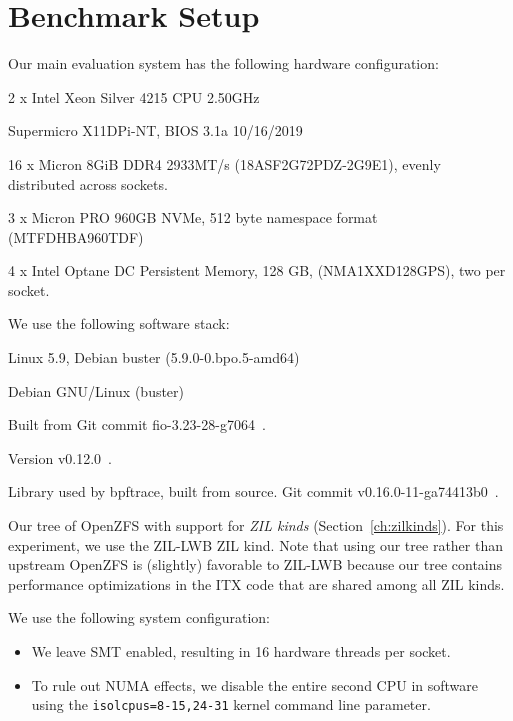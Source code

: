 \documentclass[12pt,a4paper,twoside]{book}
\begin{document}
{\section{Benchmark Setup}\label{ch:lwb_analysis:setup}
Our main evaluation system has the following hardware configuration:
\begin{description}[noitemsep,leftmargin=1.5cm,labelindent=1cm]
    \item[CPU] 2 x Intel Xeon Silver 4215 CPU \@ 2.50GHz
    \item[Mainboard] Supermicro X11DPi-NT, BIOS 3.1a 10/16/2019
    \item[DRAM] 16 x Micron 8GiB DDR4 2933MT/s (\mbox{18ASF2G72PDZ-2G9E1}), evenly distributed across sockets.
    \item[NVMe] 3 x Micron PRO 960GB NVMe, 512 byte namespace format (MTFDHBA960TDF)
    \item[PMEM] 4 x Intel Optane DC Persistent Memory, 128 GB, (NMA1XXD128GPS), two per socket.
\end{description}
We use the following software stack:
\begin{description}[noitemsep,leftmargin=1.5cm,labelindent=1cm]
    \item[Kernel] Linux 5.9, Debian buster (5.9.0-0.bpo.5-amd64)
    \item[Userland] Debian GNU/Linux (buster)
    \item[fio - Flexible I/O Tester] Built from Git commit \mbox{fio-3.23-28-g7064}~\cite{fioGithubPage}.
    \item[bpftrace - High-level Language for eBPF] Version v0.12.0~\cite{bpftraceGithubPage}.
    \item[BPF Compiler Collection (BCC)] Library used by bpftrace, built from source. Git commit \mbox{v0.16.0-11-ga74413b0}~\cite{IovisorBccGithubPage}.
    \item[OpenZFS] Our tree of OpenZFS with support for \textit{ZIL kinds} (Section~\ref{ch:zilkinds}).
        For this experiment, we use the ZIL-LWB ZIL kind.
        Note that using our tree rather than upstream OpenZFS is (slightly) favorable to ZIL-LWB because our tree contains performance optimizations in the ITX code that are shared among all ZIL kinds.
\end{description}
We use the following system configuration:
\begin{itemize}[noitemsep]
    \item We leave SMT enabled, resulting in 16 hardware threads per socket.
    \item To rule out NUMA effects, we disable the entire second CPU in software using the \lstinline{isolcpus=8-15,24-31} kernel command line parameter.

\end{itemize}}
\end{document}
